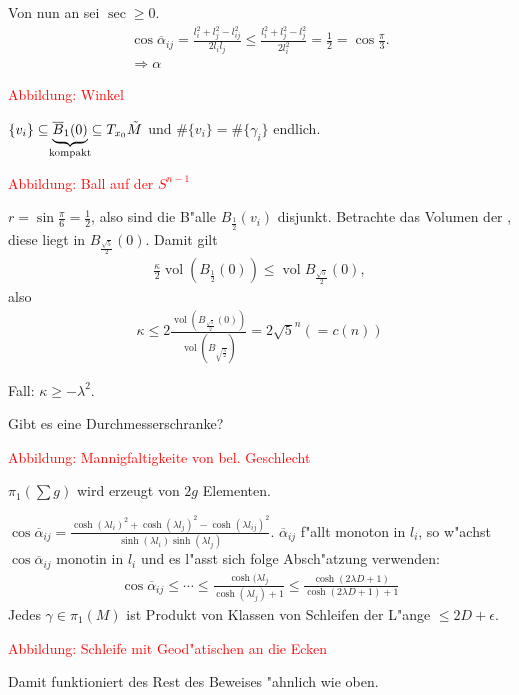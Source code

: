\begin{emptythm}[Beweisskizze]
  Von nun an sei $\sec \geq 0$.
  \begin{align*}
    \cos \overline \alpha_{ij} = \frac{l_i^2 + l_j^2 - l_{ij}^2}{2l_il_j} \leq \frac{l_i^2 + l_j^2 - l_j^2}{2l_i^2} 
    = \frac{1}{2} 
    = \cos \frac{\pi}{3}.\\
    \Rightarrow \alpha
  \end{align*}

  \begin{center}
    \textcolor{red}{Abbildung: Winkel}
  \end{center}
  $\{v_i\} \subseteq \underbrace{\overline B_1(0)}_{\mathclap{\text{kompakt}}} \subseteq T_{x_0}\tilde M$ und $\#\{v_i\} = \#\{\gamma_i\}$ endlich.

  \begin{center}
    \textcolor{red}{Abbildung: Ball auf der $S^{n-1}$}
  \end{center}
  $r = \sin \frac{\pi}{6} = \frac{1}{2}$, also sind die B"alle $B_{\frac{1}{2}}(v_i)$ disjunkt.
  Betrachte das Volumen der , diese liegt in $B_{\frac{\sqrt{5}}{2}}(0)$.
  Damit gilt
  \begin{align*}
    \frac{\kappa}{2} \operatorname{vol}(B_{\frac{1}{2}}(0)) \leq \operatorname{vol}B_{\frac{\sqrt 5}{2}}(0),
  \end{align*}
  also 
  \begin{align*}
    \kappa \leq 2 \frac{\operatorname{vol}\left(B_{\frac{\sqrt{5}}{2}}(0)\right)}{\operatorname{vol}\left(B_{\sqrt{\frac{5}{2}}}\right)}
    = 2\sqrt{5}^n 
    ( = c(n))
  \end{align*}

  Fall: $\kappa \geq -\lambda^2$.

  Gibt es eine Durchmesserschranke?
  \begin{center}
    \textcolor{red}{Abbildung: Mannigfaltigkeite von bel. Geschlecht}
  \end{center}

  $\pi_1(\sum g)$ wird erzeugt von $2g$ Elementen.

  $\cos \overline \alpha_{ij} = \frac{\cosh(\lambda l_i)^2 + \cosh(\lambda l_j)^2 - \cosh(\lambda l_{ij})^2}{\sinh(\lambda l_i)\sinh(\lambda l_j)}$.
  $\overline \alpha_{ij}$ f"allt monoton in $l_i$, so w"achst $\cos \overline \alpha_{ij}$ monotin in $l_i$ und es l"asst sich folge Absch"atzung verwenden:
  \begin{align*}
    \cos \overline \alpha_{ij} \leq \cdots \leq \frac{\cosh(\lambda l_j}{\cosh(\lambda l_j) + 1}
    \leq \frac{\cosh(2 \lambda D + 1)}{\cosh(2 \lambda D + 1) + 1}
  \end{align*}
  Jedes $\gamma \in \pi_1(M)$ ist Produkt von Klassen von Schleifen der L"ange $\leq 2D + \epsilon$.
  \begin{center}
    \textcolor{red}{Abbildung: Schleife mit Geod"atischen an die Ecken}
  \end{center}

  Damit funktioniert des Rest des Beweises "ahnlich wie oben.
\end{emptythm}


